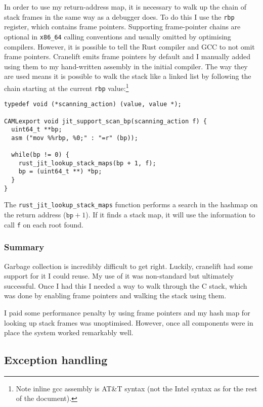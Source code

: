 In order to use my return-address map, it is necessary to walk up the chain of stack frames in the
same way as a debugger does. To do this I use the \texttt{rbp} register, which contains frame
pointers. Supporting frame-pointer chains are optional in \texttt{x86\_64} calling conventions and
usually omitted by optimising compilers. However, it is possible to tell the Rust compiler and GCC
to not omit frame pointers. Cranelift emits frame pointers by default and I manually added using
them to my hand-written assembly in the initial compiler.
The way they are used means it is possible to walk the stack like a linked list by following the
chain starting at the current \texttt{rbp} value:\footnote{Note inline gcc assembly is AT\&T syntax
      (not the Intel syntax as for the rest of the
      document).}

\begin{verbatim}
typedef void (*scanning_action) (value, value *);

CAMLexport void jit_support_scan_bp(scanning_action f) {
  uint64_t **bp;
  asm ("mov %%rbp, %0;" : "=r" (bp));

  while(bp != 0) {
    rust_jit_lookup_stack_maps(bp + 1, f);
    bp = (uint64_t **) *bp;
  }
}
\end{verbatim}

The \texttt{rust\_jit\_lookup\_stack\_maps} function performs a search in the hashmap on the return
address
($\texttt{bp} + 1$). If it finds a stack map, it will use the information to call \texttt{f} on
each root found.

\subsubsection{Summary}

Garbage collection is incredibly difficult to get right. Luckily, cranelift had some support for it
I could reuse. My use of it was non-standard but ultimately successful. Once I had this I needed a
way to walk through the C stack, which was done by enabling frame pointers and walking the stack
using them.

I paid some performance penalty by using frame pointers and my hash map for looking up stack frames
was unoptimised. However, once all components were in place the system worked remarkably well.

\subsection{Exception handling} \label{exception-handling}


